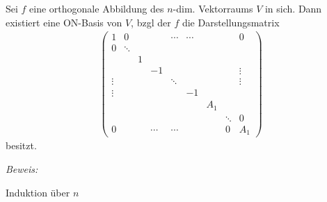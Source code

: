 \begin{mysatz}
    Sei $f$ eine orthogonale Abbildung des $n$-dim. Vektorraums $V$ in sich.
    Dann existiert eine ON-Basis von $V$, bzgl der $f$ die Darstellungsmatrix
    \begin{align*}
        \begin{pmatrix}
            1 & 0 & & & \cdots &\cdots & & & 0 \\
            0 & \ddots & & & & & & & \\
            & & 1 & & & & & & \\
            & & & -1 & & & & & \vdots \\
            \vdots & & & & \ddots & & &  &\vdots \\
            \vdots & & & & & -1 & & & \\
            & & & & & & A_1 & & \\
            & & & & & & & \ddots & 0 \\
            0 & & & \cdots & \cdots & & & 0 & A_1
        \end{pmatrix}
    \end{align*}
    besitzt.\medskip

    \textit{Beweis:}

    Induktion über $n$
\end{mysatz}
